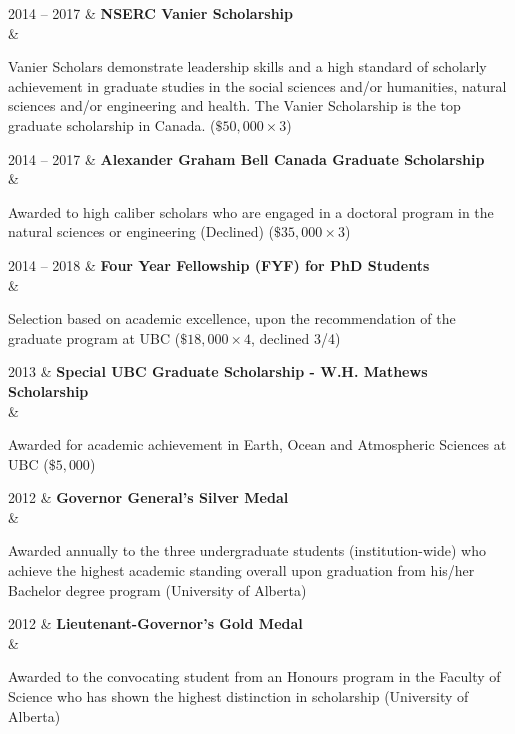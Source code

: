 \documentclass[oneside]{cv}
\newenvironment{myquote}%
  {\list{}{\leftmargin=0.5cm\rightmargin=0cm}\item[]}%
  {\endlist}
\newcommand{\myindent}[1]{
    \begin{myquote}
    \vspace{-0.7cm}
        #1
    \vspace{-0.4cm}
    \end{myquote}
}
\begin{document}
\begin{entryright}
2014 -- 2017 & \textbf{NSERC Vanier Scholarship} \\
& \myindent{Vanier Scholars demonstrate leadership skills and a high standard of scholarly achievement in graduate studies in the social sciences and/or humanities, natural sciences and/or engineering and health. The Vanier Scholarship is the top graduate scholarship in Canada. ($ \$50,000 \times 3$)}
\end{entryright}

\begin{entryright}
2014 -- 2017 & \textbf{Alexander Graham Bell Canada Graduate Scholarship} \\
& \myindent{Awarded to high caliber scholars who are engaged in a doctoral program in the natural sciences or engineering (Declined) ($ \$35,000 \times 3$)}
\end{entryright}

\begin{entryright}
2014 -- 2018 & \textbf{Four Year Fellowship (FYF) for PhD Students} \\
& \myindent{Selection based on academic excellence, upon the recommendation of the graduate program at UBC ($\$18,000 \times 4$, declined 3/4)}
\end{entryright}

\begin{entryright}
2013 & \textbf{Special UBC Graduate Scholarship - W.H. Mathews Scholarship} \\
& \myindent{Awarded for academic achievement in Earth, Ocean and Atmospheric Sciences at UBC ($\$5,000$)}
\end{entryright}

\begin{entryright}
2012 & \textbf{Governor General’s Silver Medal} \\
& \myindent{Awarded annually to the three undergraduate students (institution-wide) who achieve the highest academic standing overall upon graduation from his/her Bachelor degree program (University of Alberta)}
\end{entryright}

\begin{entryright}
2012 & \textbf{Lieutenant-Governor’s Gold Medal} \\
& \myindent{Awarded to the convocating student from an Honours program in the Faculty of Science who has shown the highest distinction in scholarship (University of Alberta)}
\end{entryright}
\end{document}

